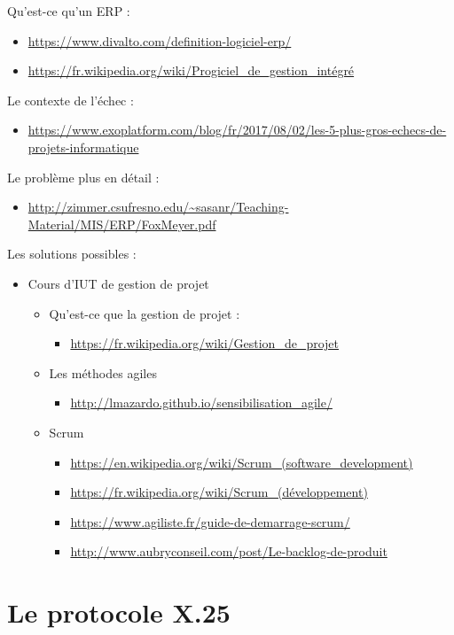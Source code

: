 \documentclass[12pt]{report}
\begin{document}
Qu'est-ce qu'un ERP :
\begin{itemize}
\item \url{https://www.divalto.com/definition-logiciel-erp/}
\item \url{https://fr.wikipedia.org/wiki/Progiciel\_de\_gestion\_intégré}
\end{itemize}
Le contexte de l'échec :
\begin{itemize}
\item \url{https://www.exoplatform.com/blog/fr/2017/08/02/les-5-plus-gros-echecs-de-projets-informatique}
\end{itemize}
Le problème plus en détail : 
\begin{itemize}
\item \url{http://zimmer.csufresno.edu/~sasanr/Teaching-Material/MIS/ERP/FoxMeyer.pdf}
\end{itemize}
Les solutions possibles :
\begin{itemize}
	\item Cours d'IUT de gestion de projet
	\begin{itemize}
		\item Qu'est-ce que la gestion de projet :
		\begin{itemize}
			\item \url{https://fr.wikipedia.org/wiki/Gestion\_de\_projet}
		\end{itemize}
		\item Les méthodes agiles
		\begin{itemize}
			\item \url{http://lmazardo.github.io/sensibilisation\_agile/}
		\end{itemize}
		\item Scrum
		\begin{itemize}
			\item \url{https://en.wikipedia.org/wiki/Scrum\_(software\_development)}
			\item \url{https://fr.wikipedia.org/wiki/Scrum\_(développement)}
			\item \url{https://www.agiliste.fr/guide-de-demarrage-scrum/}
			\item \url{http://www.aubryconseil.com/post/Le-backlog-de-produit}
		\end{itemize}
	\end{itemize}
\end{itemize}

\chapter{Le protocole X.25}
\end{document}
